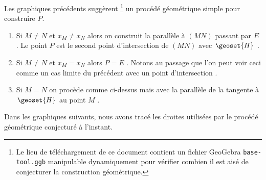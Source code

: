 \begin{multicols}{2}
	\bigskip

\end{multicols}


\bigskip
	

Les graphiques précédents suggèrent
\footnote{
	Le lieu de téléchargement de ce document contient un fichier GeoGebra \texttt{base-tool.ggb} manipulable dynamiquement pour vérifier combien il est aisé de conjecturer la construction géométrique.
}
un procédé géométrique simple pour construire $P$.

\begin{enumerate}
	\item Si $M \neq N$ et $x_M \neq x_N$ alors on construit la parallèle à $(MN)$ passant par $E$ . Le point $P$ est le second point d'intersection de $(MN)$ avec $\geoset{H}$ .


	\item Si $M \neq N$ et $x_M = x_N$ alors $P = E$ . Notons au passage que l'on peut voir ceci comme un cas limite du précédent avec un point d'intersection .


	\item Si $M = N$ on procède comme ci-dessus mais avec la parallèle de la tangente à $\geoset{H}$ au point $M$ .
\end{enumerate}


Dans les graphiques suivants, nous avons tracé les droites utilisées par le procédé géométrique conjecturé à l'instant.


\medskip


